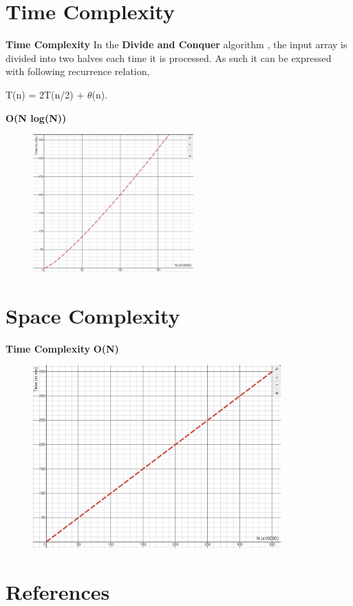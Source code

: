 \documentclass{beamer}
\begin{document}
\section{Time Complexity}
\begin{frame}{\textbf{Time Complexity}}
In the \textbf{Divide and Conquer} algorithm , the input array is divided into two halves each time it is processed.
As such it can be expressed with following recurrence relation,
\begin{center} T(n) = 2T(n/2) + $\theta$(n).\end{center}
    \textbf{O(N log(N))}
    \begin{figure}[htbp]
     \includegraphics[width=0.55\textwidth]{timeComplexity.png}\\
\end{figure}
    
\end{frame}


\section{Space Complexity}
\begin{frame}{\textbf{Time Complexity}}
    \textbf{O(N)}
    \begin{figure}[htbp]
     \includegraphics[width=0.85\textwidth]{spaceComplexity.png}\\
\end{figure}
    
\end{frame}


\section{References}
\end{document}

